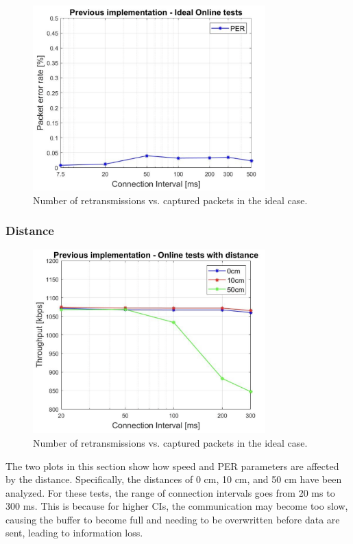 \documentclass{Configuration_Files/PoliMi3i_thesis}
\begin{document}
\begin{figure}[H]
    \centering
    \includegraphics[width=0.8\textwidth]{Results Manuel/figure3}
    \caption{Number of retransmissions vs. captured packets in the ideal case.}
    \label{fig:figure1}
\end{figure}

\subsubsection*{Distance}

\begin{figure}[H]
    \centering
    \includegraphics[width=0.8\textwidth]{Results Manuel/figure4}
    \caption{Number of retransmissions vs. captured packets in the ideal case.}
    \label{fig:figure1}
\end{figure}

The two plots in this section show how speed and PER parameters are affected by the distance. Specifically, the distances of 0 cm, 10 cm, and 50 cm have been analyzed. For these tests, the range of connection intervals goes from 20 ms to 300 ms. This is because for higher CIs, the communication may become too slow, causing the buffer to become full and needing to be overwritten before data are sent, leading to information loss.
\end{document}
